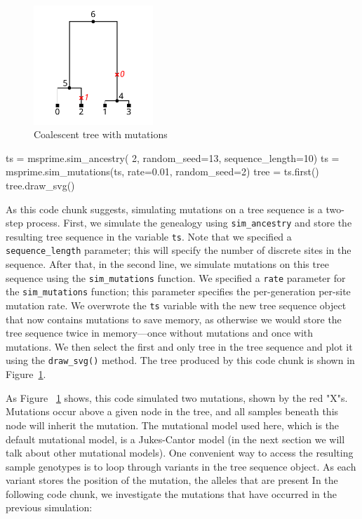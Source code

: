 \documentclass[graybox]{svmult}
\begin{document}
\begin{figure}[t]
\begin{center}
\includegraphics[width=0.4\textwidth]{images/plot_2.pdf}
\end{center}
\caption{\label{fig-tree-mutations} Coalescent tree with mutations}
\end{figure}

\begin{pythoncode}
ts = msprime.sim_ancestry(
    2, random_seed=13, sequence_length=10)
ts = msprime.sim_mutations(ts, rate=0.01, random_seed=2)
tree = ts.first()
tree.draw_svg()
\end{pythoncode}

As this code chunk suggests, simulating mutations on a tree sequence is a two-step process.
First, we simulate the genealogy using \texttt{sim\_ancestry} and store the resulting
tree sequence in the variable \texttt{ts}. Note that we specified a \texttt{sequence\_length} parameter;
this will specify the number of discrete sites in the sequence. After that, in the second
line, we simulate mutations on this tree sequence using the \texttt{sim\_mutations} function.
We specified a \texttt{rate} parameter for the \texttt{sim\_mutations} function; this
parameter specifies the per-generation per-site mutation rate. We overwrote the \texttt{ts} variable
with the new tree sequence object that now contains mutations to save memory, as otherwise we would
store the tree sequence twice in memory---once without mutations and once with mutations. We then
select the first and only tree in the tree sequence and plot it using the \texttt{draw\_svg()}
method. The tree produced by this code chunk is shown in Figure~\ref{fig-tree-mutations}.

As Figure ~\ref{fig-tree-mutations} shows, this code simulated two mutations, shown by the red "X"s.
Mutations occur above a given node in the tree, and all samples beneath
this node will inherit the mutation. The mutational model used here, which is the default mutational
model, is a Jukes-Cantor model (in the next section we will talk about other mutational models).
One convenient way to access the resulting sample genotypes is to loop through variants in the
tree sequence object. As each variant stores the position of the mutation, the alleles that are present
In the following code chunk, we investigate the mutations that have occurred in the previous simulation:
\end{document}
